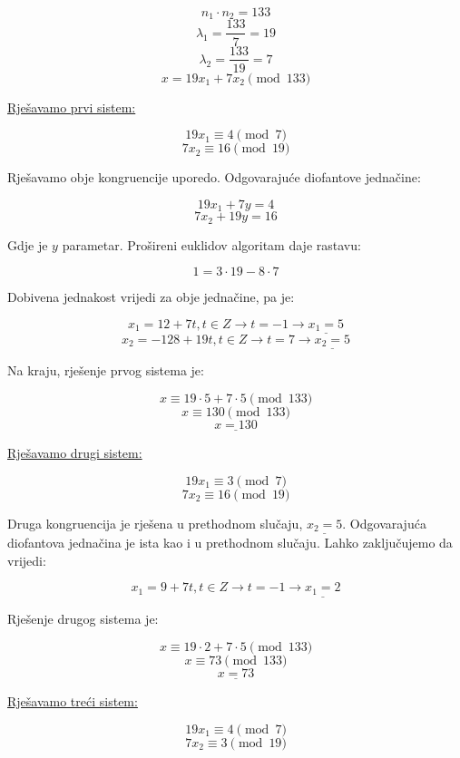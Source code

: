 \documentclass[12pt]{article}
\begin{document}
$$n_{1} \cdot n_{2} = 133$$
$$\lambda_{1} = \frac{133}{7} = 19$$
$$\lambda_{2} = \frac{133}{19} = 7$$
$$x = 19x_{1} + 7x_{2} \pmod{133}$$\vspace{1mm}

\underline{Rješavamo prvi sistem:}

$$19x_{1} \equiv 4 \pmod{7}$$
$$7x_{2} \equiv 16 \pmod{19}$$\vspace{1mm}

Rješavamo obje kongruencije uporedo. Odgovarajuće diofantove jednačine:

$$19x_{1} + 7y = 4$$
$$7x_{2} + 19y = 16$$\vspace{1mm}

Gdje je $y$ parametar. Prošireni euklidov algoritam daje rastavu:

$$1 = 3 \cdot 19 - 8 \cdot 7$$\vspace{1mm}

Dobivena jednakost vrijedi za obje jednačine, pa je:

$$x_{1} = 12 + 7t, t \in Z \to t = -1 \to \underline{x_{1} = 5}$$
$$x_{2} = -128 + 19t, t \in Z \to t = 7 \to \underline{x_{2} = 5}$$\vspace{1mm}

Na kraju, rješenje prvog sistema je:

$$x \equiv 19 \cdot 5 + 7 \cdot 5 \pmod{133}$$
$$x \equiv 130 \pmod{133}$$
$$\underline{x = 130}$$\vspace{1mm}

\underline{Rješavamo drugi sistem:}

$$19x_{1} \equiv 3 \pmod{7}$$
$$7x_{2} \equiv 16 \pmod{19}$$\vspace{1mm}

Druga kongruencija je rješena u prethodnom slučaju, $\underline{x_{2} = 5}$. Odgovarajuća diofantova jednačina je ista kao i u prethodnom slučaju. Lahko zaključujemo da vrijedi:

$$x_{1} = 9 + 7t, t \in Z \to t = -1 \to \underline{x_{1} = 2}$$\vspace{1mm}

Rješenje drugog sistema je:

$$x \equiv 19 \cdot 2 + 7 \cdot 5 \pmod{133}$$
$$x \equiv 73 \pmod{133}$$
$$\underline{x = 73}$$\vspace{1mm}

\underline{Rješavamo treći sistem:}

$$19x_{1} \equiv 4 \pmod{7}$$
$$7x_{2} \equiv 3 \pmod{19}$$\vspace{1mm}
\end{document}
